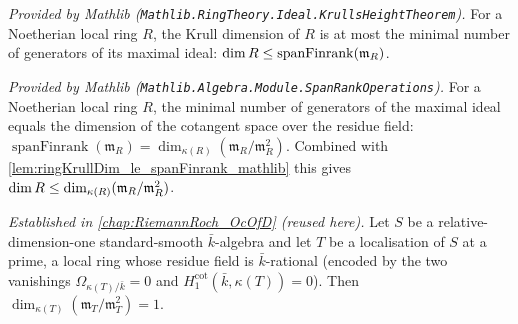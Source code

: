 \begin{lemma}
  \label{lem:ringKrullDim_le_spanFinrank_mathlib}
  \mathlibok
  \textit{Provided by Mathlib (\texttt{Mathlib.RingTheory.Ideal.KrullsHeightTheorem}).}
  For a Noetherian local ring \(R\), the Krull dimension of \(R\) is at most the
  minimal number of generators of its maximal ideal:
  \(\dim R \le \operatorname{spanFinrank}(\mathfrak m_R)\).
\end{lemma}

\begin{lemma}
  \label{lem:spanFinrank_eq_finrank_cotangent_mathlib}
  \mathlibok
  \textit{Provided by Mathlib (\texttt{Mathlib.Algebra.Module.SpanRankOperations}).}
  For a Noetherian local ring \(R\), the minimal number of generators of the maximal
  ideal equals the dimension of the cotangent space over the residue field:
  \(\operatorname{spanFinrank}(\mathfrak m_R) = \dim_{\kappa(R)}(\mathfrak m_R/\mathfrak
  m_R^2)\).  Combined with \cref{lem:ringKrullDim_le_spanFinrank_mathlib} this gives
  \(\dim R \le \dim_{\kappa(R)}(\mathfrak m_R/\mathfrak m_R^2)\).
\end{lemma}

\begin{lemma}
  \label{lem:cotangent_localization_eq_one_bridge}
  \textit{Established in \cref{chap:RiemannRoch_OcOfD} (reused here).}
  Let \(S\) be a relative-dimension-one standard-smooth \(\bar k\)-algebra and let
  \(T\) be a localisation of \(S\) at a prime, a local ring whose residue field is
  \(\bar k\)-rational (encoded by the two vanishings \(\Omega_{\kappa(T)/\bar k} = 0\)
  and \(H_1^{\mathrm{cot}}(\bar k, \kappa(T)) = 0\)).  Then
  \(\dim_{\kappa(T)}(\mathfrak m_T/\mathfrak m_T^2) = 1\).
\end{lemma}

